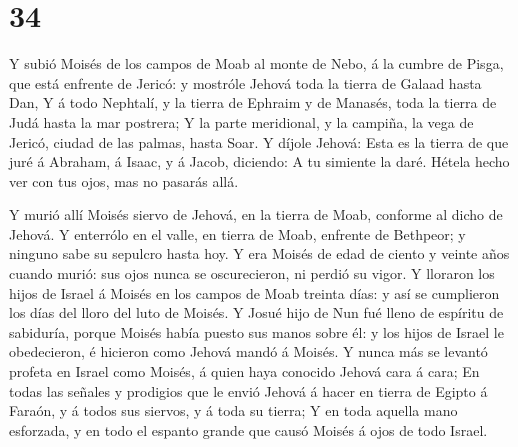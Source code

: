 \hypertarget{section-33}{%
\section{34}\label{section-33}}

 Y subió Moisés de los campos de Moab al monte de Nebo, á la
cumbre de Pisga, que está enfrente de Jericó: y mostróle Jehová toda la
tierra de Galaad hasta Dan,  Y á todo Nephtalí, y la tierra
de Ephraim y de Manasés, toda la tierra de Judá hasta la mar postrera;
 Y la parte meridional, y la campiña, la vega de Jericó,
ciudad de las palmas, hasta Soar.  Y díjole Jehová: Esta es
la tierra de que juré á Abraham, á Isaac, y á Jacob, diciendo: A tu
simiente la daré. Hétela hecho ver con tus ojos, mas no pasarás allá.

 Y murió allí Moisés siervo de Jehová, en la tierra de Moab,
conforme al dicho de Jehová.  Y enterrólo en el valle, en
tierra de Moab, enfrente de Bethpeor; y ninguno sabe su sepulcro hasta
hoy.  Y era Moisés de edad de ciento y veinte años cuando
murió: sus ojos nunca se oscurecieron, ni perdió su vigor. 
Y lloraron los hijos de Israel á Moisés en los campos de Moab treinta
días: y así se cumplieron los días del lloro del luto de Moisés.
 Y Josué hijo de Nun fué lleno de espíritu de sabiduría,
porque Moisés había puesto sus manos sobre él: y los hijos de Israel le
obedecieron, é hicieron como Jehová mandó á Moisés.  Y
nunca más se levantó profeta en Israel como Moisés, á quien haya
conocido Jehová cara á cara;  En todas las señales y
prodigios que le envió Jehová á hacer en tierra de Egipto á Faraón, y á
todos sus siervos, y á toda su tierra;  Y en toda aquella
mano esforzada, y en todo el espanto grande que causó Moisés á ojos de
todo Israel.
